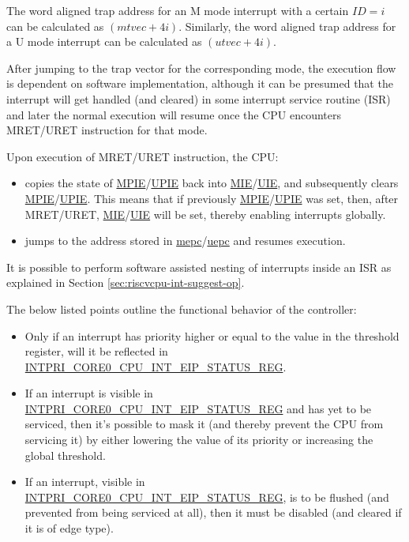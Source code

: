 \documentclass[main\_\_EN.tex]{subfiles}
\begin{document}
The word aligned trap address for an M mode interrupt with a certain $ID=i$ can be calculated as $(\hyperref[fielddesc:MTVECBASE]{mtvec} + 4i)$. Similarly, the word aligned trap address for a U mode interrupt can be calculated as $(\hyperref[fielddesc:UTVECBASE]{utvec} + 4i)$.

After jumping to the trap vector for the corresponding mode, the execution flow is dependent on software implementation, although it can be presumed that the interrupt will get handled (and cleared) in some interrupt service routine (ISR) and later the normal execution will resume once the CPU encounters MRET/URET instruction for that mode.

Upon execution of MRET/URET instruction, the CPU:
\begin{itemize}
    \item copies the state of \hyperref[fielddesc:MSTATUSMPIE]{MPIE}/\hyperref[fielddesc:MSTATUSUPIE]{UPIE} back into \hyperref[fielddesc:MSTATUSMIE]{MIE}/\hyperref[fielddesc:USTATUSUIE]{UIE}, and subsequently clears \hyperref[fielddesc:MSTATUSMPIE]{MPIE}/\hyperref[fielddesc:USTATUSUPIE]{UPIE}. This means that if previously \hyperref[fielddesc:MSTATUSMPIE]{MPIE}/\hyperref[fielddesc:USTATUSUPIE]{UPIE} was set, then, after MRET/URET, \hyperref[fielddesc:MSTATUSMIE]{MIE}/\hyperref[fielddesc:USTATUSUIE]{UIE} will be set, thereby enabling interrupts globally.
    \item jumps to the address stored in \hyperref[regdesc:MEPC]{mepc}/\hyperref[regdesc:UEPC]{uepc} and resumes execution.
    \end{itemize}

It is possible to perform software assisted nesting of interrupts inside an ISR as explained in Section \ref{sec:riscvcpu-int-suggest-op}.

The below listed points outline the functional behavior of the controller:

\begin{itemize}
    \item Only if an interrupt has priority higher or equal to the value in the threshold register, will it be reflected in \hyperref[regdesc:INTPRICORE0CPUINTEIPSTATUSREG]{INTPRI\_CORE0\_CPU\_INT\_EIP\_STATUS\_REG}.
    \item If an interrupt is visible in \hyperref[regdesc:INTPRICORE0CPUINTEIPSTATUSREG]{INTPRI\_CORE0\_CPU\_INT\_EIP\_STATUS\_REG} and has yet to be serviced, then it's possible to mask it (and thereby prevent the CPU from servicing it) by either lowering the value of its priority or increasing the global threshold.
    \item If an interrupt, visible in \hyperref[regdesc:INTPRICORE0CPUINTEIPSTATUSREG]{INTPRI\_CORE0\_CPU\_INT\_EIP\_STATUS\_REG}, is to be flushed (and prevented from being serviced at all), then it must be disabled (and cleared if it is of edge type).
\end{itemize}
\end{document}
